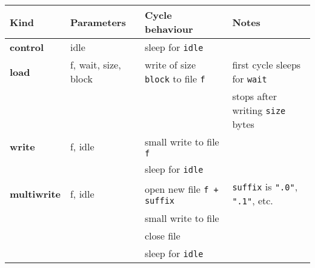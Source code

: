 \begin{tabular}{@{}llll@{}} \toprule
  Kind & Parameters & Cycle behaviour & Notes \\
\midrule
  \textbf{control} & idle &  sleep for \texttt{idle} & \\
\midrule
  \textbf{load} & f, wait, size, block &  write of size \texttt{block} to file \texttt{f} & first cycle sleeps for \texttt{wait} \\
    &&& stops after writing \texttt{size} bytes \\
\midrule
  \textbf{write} & f, idle &  small write to file \texttt{f} & \\
    && sleep for \texttt{idle} & \\
\midrule
  \textbf{multiwrite} & f, idle &  open new file \texttt{f + suffix} & \texttt{suffix} is \texttt{".0"}, \texttt{".1"}, etc. \\
    && small write to file & \\
    && close file & \\
    && sleep for \texttt{idle} & \\
\bottomrule \end{tabular}
